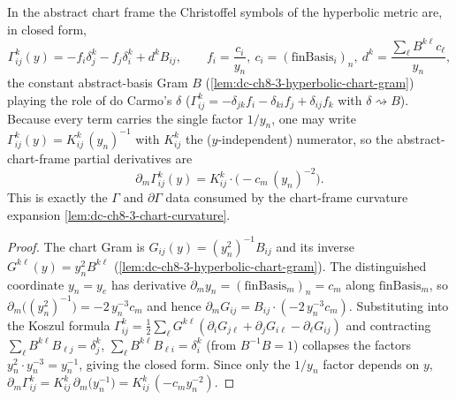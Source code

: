 \begin{lemma}
  \label{lem:dc-ch8-3-hyperbolic-christoffel}
  \leanok
  In the abstract chart frame the Christoffel symbols of the hyperbolic metric are,
  in closed form,
  $$\Gamma^k_{ij}(y)=-f_i\delta^k_j-f_j\delta^k_i+d^k B_{ij},\qquad
    f_i=\frac{c_i}{y_n},\ c_i=(\text{finBasis}_i)_n,\ d^k=\frac{\sum_\ell B^{k\ell}c_\ell}{y_n},$$
  the constant abstract-basis Gram $B$ (\cref{lem:dc-ch8-3-hyperbolic-chart-gram})
  playing the role of do Carmo's $\delta$
  ($\Gamma^k_{ij}=-\delta_{jk}f_i-\delta_{ki}f_j+\delta_{ij}f_k$ with $\delta\rightsquigarrow B$).
  Because every term carries the single factor $1/y_n$, one may write
  $\Gamma^k_{ij}(y)=K^k_{ij}\,(y_n)^{-1}$ with $K^k_{ij}$ the ($y$-independent)
  numerator, so the abstract-chart-frame partial derivatives are
  $$\partial_m\Gamma^k_{ij}(y)=K^k_{ij}\cdot\bigl(-c_m\,(y_n)^{-2}\bigr).$$
  This is exactly the $\Gamma$ and $\partial\Gamma$ data consumed by the chart-frame
  curvature expansion \cref{lem:dc-ch8-3-chart-curvature}.
\end{lemma}
\begin{proof}
  \leanok
  The chart Gram is $G_{ij}(y)=(y_n^2)^{-1}B_{ij}$ and its inverse
  $G^{k\ell}(y)=y_n^2 B^{k\ell}$ (\cref{lem:dc-ch8-3-hyperbolic-chart-gram}). The
  distinguished coordinate $y_n=y_e$ has derivative
  $\partial_m y_n=(\text{finBasis}_m)_n=c_m$ along $\text{finBasis}_m$, so
  $\partial_m\bigl((y_n^2)^{-1}\bigr)=-2\,y_n^{-3}c_m$ and hence
  $\partial_m G_{ij}=B_{ij}\cdot(-2\,y_n^{-3}c_m)$. Substituting into the Koszul
  formula
  $\Gamma^k_{ij}=\tfrac12\sum_\ell G^{k\ell}(\partial_iG_{j\ell}+\partial_jG_{i\ell}-\partial_\ell G_{ij})$
  and contracting $\sum_\ell B^{k\ell}B_{\ell j}=\delta^k_j$,
  $\sum_\ell B^{k\ell}B_{\ell i}=\delta^k_i$ (from $B^{-1}B=1$) collapses the factors
  $y_n^2\cdot y_n^{-3}=y_n^{-1}$, giving the closed form. Since only the $1/y_n$ factor
  depends on $y$, $\partial_m\Gamma^k_{ij}=K^k_{ij}\,\partial_m\bigl(y_n^{-1}\bigr)
  =K^k_{ij}\,(-c_m y_n^{-2})$.
\end{proof}

